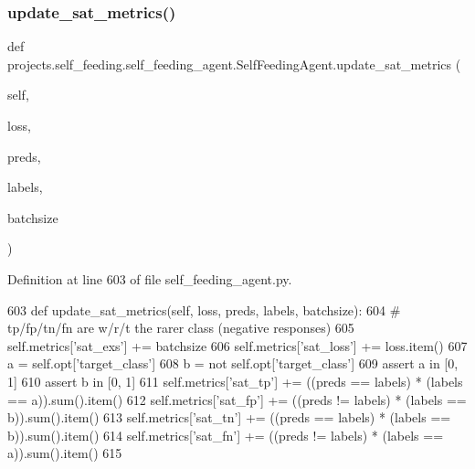 \subsubsection{\texorpdfstring{update\+\_\+sat\+\_\+metrics()}{update\_sat\_metrics()}}
{\footnotesize\ttfamily def projects.\+self\+\_\+feeding.\+self\+\_\+feeding\+\_\+agent.\+Self\+Feeding\+Agent.\+update\+\_\+sat\+\_\+metrics (\begin{DoxyParamCaption}\item[{}]{self,  }\item[{}]{loss,  }\item[{}]{preds,  }\item[{}]{labels,  }\item[{}]{batchsize }\end{DoxyParamCaption})}



Definition at line 603 of file self\+\_\+feeding\+\_\+agent.\+py.


\begin{DoxyCode}
603     \textcolor{keyword}{def }update\_sat\_metrics(self, loss, preds, labels, batchsize):
604         \textcolor{comment}{# tp/fp/tn/fn are w/r/t the rarer class (negative responses)}
605         self.metrics[\textcolor{stringliteral}{'sat\_exs'}] += batchsize
606         self.metrics[\textcolor{stringliteral}{'sat\_loss'}] += loss.item()
607         a = self.opt[\textcolor{stringliteral}{'target\_class'}]
608         b = \textcolor{keywordflow}{not} self.opt[\textcolor{stringliteral}{'target\_class'}]
609         \textcolor{keyword}{assert} a \textcolor{keywordflow}{in} [0, 1]
610         \textcolor{keyword}{assert} b \textcolor{keywordflow}{in} [0, 1]
611         self.metrics[\textcolor{stringliteral}{'sat\_tp'}] += ((preds == labels) * (labels == a)).sum().item()
612         self.metrics[\textcolor{stringliteral}{'sat\_fp'}] += ((preds != labels) * (labels == b)).sum().item()
613         self.metrics[\textcolor{stringliteral}{'sat\_tn'}] += ((preds == labels) * (labels == b)).sum().item()
614         self.metrics[\textcolor{stringliteral}{'sat\_fn'}] += ((preds != labels) * (labels == a)).sum().item()
615 
\end{DoxyCode}
\mbox{\label{classprojects_1_1self__feeding_1_1self__feeding__agent_1_1SelfFeedingAgent_a89a2bb3f299fe29c018ea39af72446c6}} 
